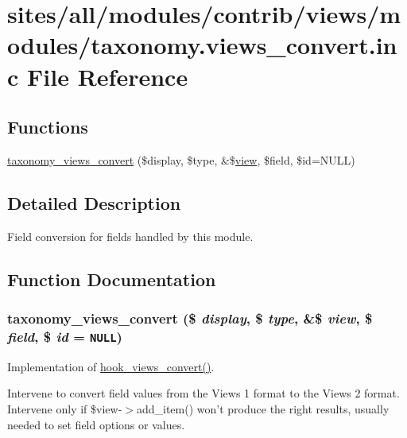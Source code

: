 \hypertarget{taxonomy_8views__convert_8inc}{
\section{sites/all/modules/contrib/views/modules/taxonomy.views\_\-convert.inc File Reference}
\label{taxonomy_8views__convert_8inc}
}
\subsection*{Functions}
\begin{CompactItemize}
\item 
\hyperlink{taxonomy_8views__convert_8inc_bf3905d381bf4e7271165645ccb21ea3}{taxonomy\_\-views\_\-convert} (\$display, \$type, \&\$\hyperlink{classview}{view}, \$field, \$id=NULL)
\end{CompactItemize}


\subsection{Detailed Description}
Field conversion for fields handled by this module. 

\subsection{Function Documentation}
\hypertarget{taxonomy_8views__convert_8inc_bf3905d381bf4e7271165645ccb21ea3}{
\subsubsection[{taxonomy\_\-views\_\-convert}]{\setlength{\rightskip}{0pt plus 5cm}taxonomy\_\-views\_\-convert (\$ {\em display}, \/  \$ {\em type}, \/  \&\$ {\em view}, \/  \$ {\em field}, \/  \$ {\em id} = {\tt NULL})}}
\label{taxonomy_8views__convert_8inc_bf3905d381bf4e7271165645ccb21ea3}


Implementation of \hyperlink{group__views__hooks_ge98b0a1c700fe1406af390dfc8c7262e}{hook\_\-views\_\-convert()}.

Intervene to convert field values from the Views 1 format to the Views 2 format. Intervene only if \$view-$>$add\_\-item() won't produce the right results, usually needed to set field options or values. 